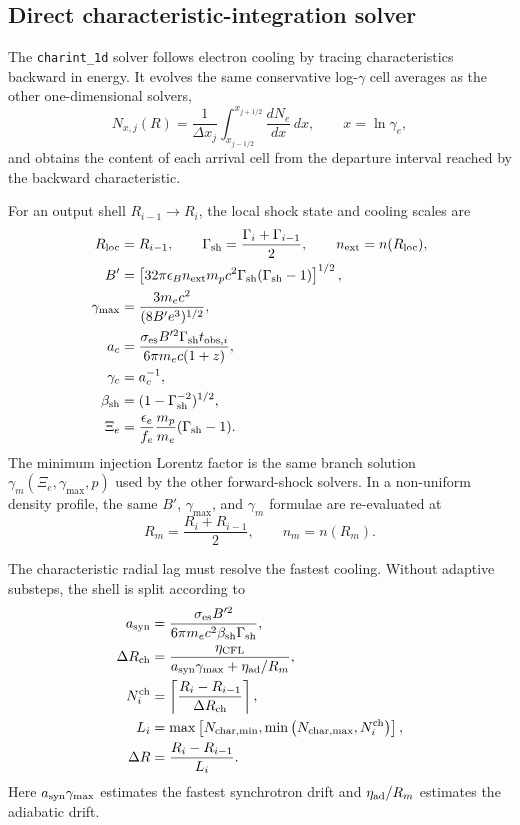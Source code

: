 \documentclass[twocolumn]{aastex702}
\begin{document}
\subsection{Direct characteristic-integration solver}

The \texttt{charint\_1d} solver follows electron cooling by tracing
characteristics backward in energy.  It evolves the same conservative
log-\(\gamma\) cell averages as the other one-dimensional solvers,
\begin{equation}
N_{x,j}(R)=\frac{1}{\Delta x_j}
\int_{x_{j-1/2}}^{x_{j+1/2}}\frac{dN_e}{dx}\,dx,
\qquad x=\ln\gamma_e,
\end{equation}
and obtains the content of each arrival cell from the departure interval reached
by the backward characteristic.

For an output shell \(R_{i-1}\rightarrow R_i\), the local shock state and cooling
scales are
\begin{equation}
\begin{aligned}
R_{\rm loc}&=R_{i-1},\qquad
\Gamma_{\rm sh}=\frac{\Gamma_i+\Gamma_{i-1}}{2},\qquad
n_{\rm ext}=n(R_{\rm loc}),\\
B'&=\left[32\pi\epsilon_B n_{\rm ext}m_pc^2
\Gamma_{\rm sh}(\Gamma_{\rm sh}-1)\right]^{1/2},\\
\gamma_{\max}&=\frac{3m_ec^2}{(8B'e^3)^{1/2}},\\
a_c&=\frac{\sigma_{\rm es}B'^2\Gamma_{\rm sh}t_{{\rm obs},i}}
{6\pi m_ec(1+z)},\\
\gamma_c&=a_c^{-1},\\
\beta_{\rm sh}&=(1-\Gamma_{\rm sh}^{-2})^{1/2},\\
\Xi_e&=\frac{\epsilon_e}{f_e}\frac{m_p}{m_e}(\Gamma_{\rm sh}-1).
\end{aligned}
\end{equation}
The minimum injection Lorentz factor is the same branch solution
\(\gamma_m(\Xi_e,\gamma_{\max},p)\) used by the other forward-shock solvers.  In
a non-uniform density profile, the same \(B'\), \(\gamma_{\max}\), and
\(\gamma_m\) formulae are re-evaluated at
\begin{equation}
R_m=\frac{R_i+R_{i-1}}{2},
\qquad n_m=n(R_m) .
\end{equation}

The characteristic radial lag must resolve the fastest cooling.  Without
adaptive substeps, the shell is split according to
\begin{equation}
\begin{aligned}
a_{\rm syn}&=\frac{\sigma_{\rm es}B'^2}{6\pi m_ec^2\beta_{\rm sh}\Gamma_{\rm sh}},\\
\Delta R_{\rm ch}&=\frac{\eta_{\rm CFL}}
{a_{\rm syn}\gamma_{\max}+\eta_{\rm ad}/R_m},\\
N_i^{\rm ch}&=\left\lceil\frac{R_i-R_{i-1}}{\Delta R_{\rm ch}}\right\rceil,\\
L_i&=\max\left[
N_{\rm char,min},
\min\left(N_{\rm char,max},N_i^{\rm ch}\right)
\right],\\
\Delta R&=\frac{R_i-R_{i-1}}{L_i}.
\end{aligned}
\end{equation}
Here \(a_{\rm syn}\gamma_{\max}\) estimates the fastest synchrotron drift and
\(\eta_{\rm ad}/R_m\) estimates the adiabatic drift.
\end{document}
